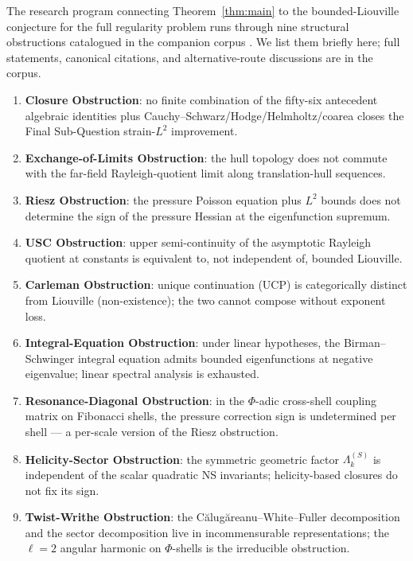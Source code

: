\documentclass[11pt]{amsart}
\theoremstyle{definition}
\begin{document}
The research program connecting Theorem~\ref{thm:main} to the
bounded-Liouville conjecture for the full regularity problem
runs through nine structural obstructions catalogued in the
companion corpus \cite{CompanionCorpus}. We list them briefly
here; full statements, canonical citations, and alternative-route
discussions are in the corpus.

\begin{enumerate}[label=(O\arabic*), itemsep=2pt]
\item \textbf{Closure Obstruction}: no finite combination of the
fifty-six antecedent algebraic identities plus
Cauchy--Schwarz/Hodge/Helmholtz/coarea closes the Final
Sub-Question strain-$L^2$ improvement.
\item \textbf{Exchange-of-Limits Obstruction}: the hull topology
does not commute with the far-field Rayleigh-quotient limit
along translation-hull sequences.
\item \textbf{Riesz Obstruction}: the pressure Poisson equation
plus $L^2$ bounds does not determine the sign of the pressure
Hessian at the eigenfunction supremum.
\item \textbf{USC Obstruction}: upper semi-continuity of the
asymptotic Rayleigh quotient at constants is equivalent to, not
independent of, bounded Liouville.
\item \textbf{Carleman Obstruction}: unique continuation (UCP)
is categorically distinct from Liouville (non-existence); the
two cannot compose without exponent loss.
\item \textbf{Integral-Equation Obstruction}: under linear
hypotheses, the Birman--Schwinger integral equation admits
bounded eigenfunctions at negative eigenvalue; linear spectral
analysis is exhausted.
\item \textbf{Resonance-Diagonal Obstruction}: in the $\Phi$-adic
cross-shell coupling matrix on Fibonacci shells, the pressure
correction sign is undetermined per shell --- a per-scale version
of the Riesz obstruction.
\item \textbf{Helicity-Sector Obstruction}: the symmetric
geometric factor $\Lambda_k^{(S)}$ is independent of the scalar
quadratic NS invariants; helicity-based closures do not fix its
sign.
\item \textbf{Twist-Writhe Obstruction}: the
C\u{a}lug\u{a}reanu--White--Fuller decomposition and the sector
decomposition live in incommensurable representations; the
$\ell = 2$ angular harmonic on $\Phi$-shells is the irreducible
obstruction.
\end{enumerate}
\end{document}
